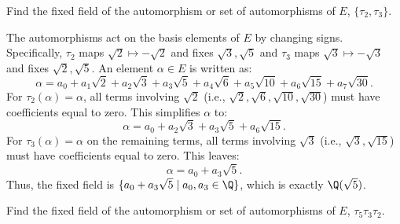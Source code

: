 \begin{problem}[43.18]
  Find the fixed field of the automorphism or set of automorphisms of $E$, $\{\tau_2, \tau_3\}$.
\end{problem}

\begin{solution}
  The automorphisms act on the basis elements of $E$ by changing signs. Specifically, $\tau_2$ maps $\sqrt{2} \mapsto -\sqrt{2}$ and fixes $\sqrt{3}, \sqrt{5}$ and $\tau_3$ maps $\sqrt{3} \mapsto -\sqrt{3}$ and fixes $\sqrt{2}, \sqrt{5}$. An element $\alpha \in E$ is written as:
  \[%
    \alpha = a_0 + a_1\sqrt{2} + a_2\sqrt{3} + a_3\sqrt{5} + a_4\sqrt{6} + a_5\sqrt{10} + a_6\sqrt{15} + a_7\sqrt{30}
  .\]%
  For $\tau_2(\alpha) = \alpha$, all terms involving $\sqrt{2}$ (i.e., $\sqrt{2}, \sqrt{6}, \sqrt{10}, \sqrt{30}$) must have coefficients equal to zero. This simplifies $\alpha$ to:
  \[%
    \alpha = a_0 + a_2\sqrt{3} + a_3\sqrt{5} + a_6\sqrt{15}
  .\]%
  For $\tau_3(\alpha) = \alpha$ on the remaining terms, all terms involving $\sqrt{3}$ (i.e., $\sqrt{3}, \sqrt{15}$) must have coefficients equal to zero. This leaves:
  \[%
    \alpha = a_0 + a_3\sqrt{5}
  .\]%
  Thus, the fixed field is $\{a_0 + a_3\sqrt{5} \mid a_0, a_3 \in \Q\}$, which is exactly $\Q(\sqrt{5})$.
\end{solution}

\begin{problem}[43.20]
  Find the fixed field of the automorphism or set of automorphisms of $E$, $\tau_5\tau_3\tau_2$.
\end{problem}

